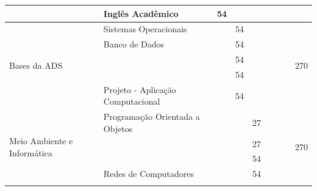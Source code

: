\documentclass[11pt,fleqn]{book} %
\begin{document}
\begin{table}[]
{\begin{tabular}{|l|l|c|c|c|c|c|c|c|}
			& Inglês Acadêmico                                              & 54              &                 &                 &                 &                 &                 &                      \\ \hline
			\multirow{5}{*}{Bases da ADS} 
			& Sistemas Operacionais                                         &                 & 54              &                 &                 &                 &                 & \multirow{5}{*}{270} \\ \cline{2-8}
			& Banco de Dados                                                &                 & 54              &                 &                 &                 &                 &                      \\ \cline{2-8}
			& \nameref{disc:arqsoft}                                        &                 & 54              &                 &                 &                 &                 &                      \\ \cline{2-8}
			& \nameref{disc:estruturadedados}                               &                 & 54              &                 &                 &                 &                 &                      \\ \cline{2-8}
			& Projeto - Aplicação Computacional                             &                 & 54              &                 &                 &                 &                 &                      \\ \hline
			\multirow{7}{*}{Meio Ambiente e Informática}                     
			& Programação Orientada a Objetos                               &                 &                 & 27              &                 &                 &                 & \multirow{7}{*}{270} \\ \cline{2-8}
			& \nameref{disc:testsoft}                                       &                 &                 & 27              &                 &                 &                 &                      \\ \cline{2-8}
			& \nameref{disc:engreq}                                         &                 &                 & 54              &                 &                 &                 &                      \\ \cline{2-8}
			& Redes de Computadores                                         &                 &                 & 54              &                 &                 &                 &                      \\ \cline{2-8}

\end{tabular}}
\end{table}
\end{document}
